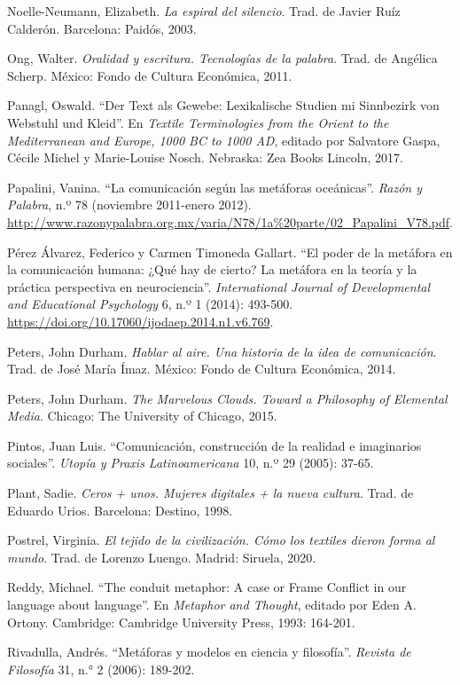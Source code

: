 \documentclass{tufte-handout}
\begin{document}
\begin{hangparas}{.25in}{1}
Noelle-Neumann, Elizabeth. \emph{La espiral del silencio}. Trad. de
Javier Ruíz Calderón. Barcelona: Paidós, 2003.

Ong, Walter. \emph{Oralidad y escritura. Tecnologías de la palabra}.
Trad. de Angélica Scherp. México: Fondo de Cultura Económica, 2011.

Panagl, Oswald. ``Der Text als Gewebe: Lexikalische Studien mi
Sinnbezirk von Webstuhl und Kleid''. En \emph{Textile Terminologies from
the Orient to the Mediterranean and Europe, 1000 BC to 1000 AD}, editado
por Salvatore Gaspa, Cécile Michel y Marie-Louise Nosch. Nebraska: Zea
Books Lincoln, 2017.

Papalini, Vanina. ``La comunicación según las metáforas oceánicas''.
\emph{Razón y Palabra}, n.º 78 (noviembre 2011-enero 2012).
\url{http://www.razonypalabra.org.mx/varia/N78/1a\%20parte/02_Papalini_V78.pdf}.

Pérez Álvarez, Federico y Carmen Timoneda Gallart. ``El poder de la
metáfora en la comunicación humana: ¿Qué hay de cierto? La metáfora en
la teoría y la práctica perspectiva en neurociencia''.
\emph{International Journal of Developmental and Educational Psychology}
6, n.º 1 (2014): 493-500.
\url{https://doi.org/10.17060/ijodaep.2014.n1.v6.769}.

Peters, John Durham. \emph{Hablar al aire. Una historia de la idea de
comunicación}. Trad. de José María Ímaz. México: Fondo de Cultura
Económica, 2014.

Peters, John Durham. \emph{The Marvelous Clouds. Toward a Philosophy of
Elemental Media}. Chicago: The University of Chicago, 2015.

Pintos, Juan Luis. ``Comunicación, construcción de la realidad e
imaginarios sociales''. \emph{Utopía y Praxis Latinoamericana} 10, n.º
29 (2005): 37-65.

Plant, Sadie. \emph{Ceros + unos. Mujeres digitales + la nueva cultura}.
Trad. de Eduardo Urios. Barcelona: Destino, 1998.

Postrel, Virginia. \emph{El tejido de la civilización. Cómo los textiles
dieron forma al mundo}. Trad. de Lorenzo Luengo. Madrid: Siruela, 2020.

Reddy, Michael. ``The conduit metaphor: A case or Frame Conflict in our
language about language''. En \emph{Metaphor and Thought}, editado por
Eden A. Ortony. Cambridge: Cambridge University Press, 1993: 164-201.

\enlargethispage{\baselineskip}

Rivadulla, Andrés. ``Metáforas y modelos en ciencia y filosofía''.
\emph{Revista de Filosofía} 31, n.° 2 (2006): 189-202.


\end{hangparas}
\end{document}
